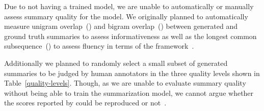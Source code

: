 Due to not having a trained model, we are unable to automatically or manually assess summary quality for the \BertSumAbs model.
We originally planned to automatically measure unigram overlap~() and bigram overlap~() between generated and ground truth summaries to assess informativeness as well as the longest common subsequence~(\RougeL) to assess fluency in terms of the \Rouge framework~\cite{Lin2004}.

Additionally we planned to randomly select a small subset of generated summaries to be judged by human annotators in the three quality levels shown in Table~\ref{quality-levels}.
Though, as we are unable to evaluate summary quality without being able to train the summarization model, we cannot argue whether the \Rouge scores reported by \citeauthor{LiuL2019} could be reproduced or not~\cite{LiuL2019}.
